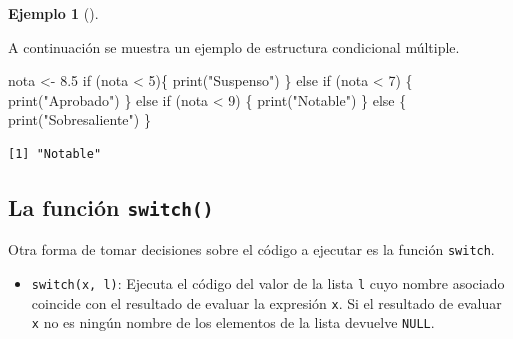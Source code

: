 \documentclass[
  a4paper,
]{scrreport}
\newenvironment{Shaded}{\begin{snugshade}}{\end{snugshade}}
\newcommand{\ControlFlowTok}[1]{\textcolor[rgb]{0.00,0.23,0.31}{#1}}
\newcommand{\DecValTok}[1]{\textcolor[rgb]{0.68,0.00,0.00}{#1}}
\newcommand{\FloatTok}[1]{\textcolor[rgb]{0.68,0.00,0.00}{#1}}
\newcommand{\FunctionTok}[1]{\textcolor[rgb]{0.28,0.35,0.67}{#1}}
\newcommand{\NormalTok}[1]{\textcolor[rgb]{0.00,0.23,0.31}{#1}}
\newcommand{\OtherTok}[1]{\textcolor[rgb]{0.00,0.23,0.31}{#1}}
\newcommand{\SpecialCharTok}[1]{\textcolor[rgb]{0.37,0.37,0.37}{#1}}
\newcommand{\StringTok}[1]{\textcolor[rgb]{0.13,0.47,0.30}{#1}}
\providecommand{\tightlist}{%
  \setlength{\itemsep}{0pt}\setlength{\parskip}{0pt}}\usepackage{longtable,booktabs,array}
\theoremstyle{definition}
\theoremstyle{definition}
\newtheorem{example}{Ejemplo}[chapter]
\theoremstyle{remark}
\begin{document}
\leavevmode{}%
\begin{example}[]\label{exm-condicional-multiple}

A continuación se muestra un ejemplo de estructura condicional múltiple.

\begin{Shaded}
\begin{Highlighting}[]
\NormalTok{nota }\OtherTok{\textless{}{-}} \FloatTok{8.5}
\ControlFlowTok{if}\NormalTok{ (nota }\SpecialCharTok{\textless{}} \DecValTok{5}\NormalTok{)\{}
  \FunctionTok{print}\NormalTok{(}\StringTok{"Suspenso"}\NormalTok{)}
\NormalTok{\} }\ControlFlowTok{else} \ControlFlowTok{if}\NormalTok{ (nota }\SpecialCharTok{\textless{}} \DecValTok{7}\NormalTok{) \{}
  \FunctionTok{print}\NormalTok{(}\StringTok{"Aprobado"}\NormalTok{)}
\NormalTok{\} }\ControlFlowTok{else} \ControlFlowTok{if}\NormalTok{ (nota }\SpecialCharTok{\textless{}} \DecValTok{9}\NormalTok{) \{}
  \FunctionTok{print}\NormalTok{(}\StringTok{"Notable"}\NormalTok{)}
\NormalTok{\} }\ControlFlowTok{else}\NormalTok{ \{}
  \FunctionTok{print}\NormalTok{(}\StringTok{"Sobresaliente"}\NormalTok{)}
\NormalTok{\}}
\end{Highlighting}
\end{Shaded}

\begin{verbatim}
[1] "Notable"
\end{verbatim}

\end{example}

\hypertarget{la-funciuxf3n-switch}{%
\subsection{\texorpdfstring{La función
\texttt{switch()}}{La función switch()}}\label{la-funciuxf3n-switch}}

Otra forma de tomar decisiones sobre el código a ejecutar es la función
\texttt{switch}.

\begin{itemize}
\tightlist
\item
  \texttt{switch(x,\ l)}: Ejecuta el código del valor de la lista
  \texttt{l} cuyo nombre asociado coincide con el resultado de evaluar
  la expresión \texttt{x}. Si el resultado de evaluar \texttt{x} no es
  ningún nombre de los elementos de la lista devuelve \texttt{NULL}.
\end{itemize}
\end{document}
